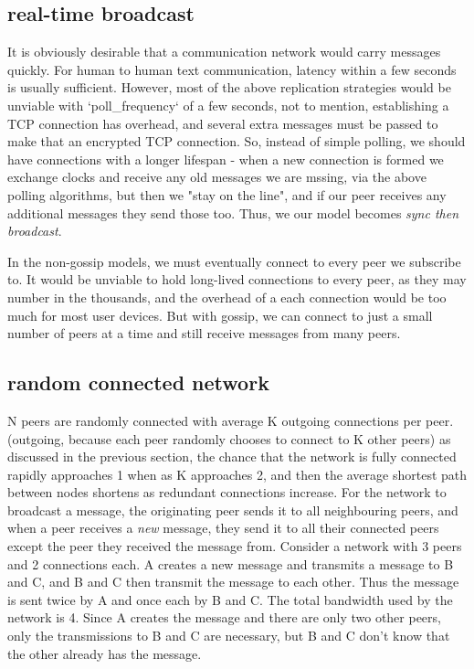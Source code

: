 \documentclass[sigconf]{acmart}
\begin{document}
\subsection{real-time broadcast}

It is obviously desirable that a communication network would carry
messages quickly. For human to human text communication, latency
within a few seconds is usually sufficient. However, most of the above
replication strategies would be unviable with `poll\_frequency` of a
few seconds, not to mention, establishing a TCP connection has
overhead, and several extra messages must be passed to make that an
encrypted TCP connection. So, instead of simple polling, we should
have connections with a longer lifespan - when a new connection is
formed we exchange clocks and receive any old messages we are mssing,
via the above polling algorithms, but then we "stay on the line", and
if our peer receives any additional messages they send those too.
Thus, we our model becomes {\em sync then broadcast}.

In the non-gossip models, we must eventually connect to every peer we
subscribe to. It would be unviable to hold long-lived connections to
every peer, as they may number in the thousands, and the overhead of a
each connection would be too much for most user devices. But with
gossip, we can connect to just a small number of peers at a time and
still receive messages from many peers.

\subsection{random connected network}

N peers are randomly connected with average K outgoing connections per
peer.  (outgoing, because each peer randomly chooses to connect to K
other peers) as discussed in the previous section, the chance that the
network is fully connected rapidly approaches 1 when as K approaches
2, and then the average shortest path between nodes shortens as
redundant connections increase.  For the network to broadcast a
message, the originating peer sends it to all neighbouring peers, and
when a peer receives a {\em new} message, they send it to all their
connected peers except the peer they received the message
from. Consider a network with 3 peers and 2 connections each.  A
creates a new message and transmits a message to B and C, and B and C
then transmit the message to each other. Thus the message is sent
twice by A and once each by B and C. The total bandwidth used by the
network is 4. Since A creates the message and there are only two other
peers, only the transmissions to B and C are necessary, but B and C
don't know that the other already has the message.
\end{document}
